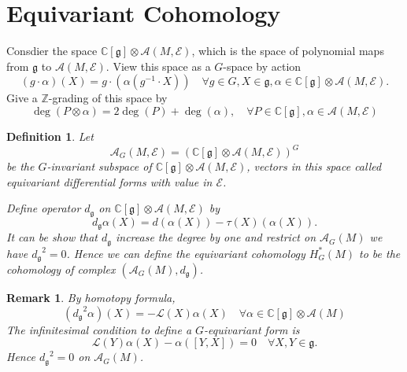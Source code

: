 \documentclass[11pt]{amsart}
\newtheorem{Def}[Thm]{Definition}
\newtheorem{Rmk}[Thm]{Remark}
\def\cA{{\mathcal{A}}}
\def\cAg{{\mathcal{A}_G}}
\def\cL{{\mathcal{L}}}
\def\cE{{\mathcal{E}}}
\def\bC{{\mathbb{C}}}
\def\bZ{{\mathbb{Z}}}
\def\fgg{{\mathfrak{g}}}
\def\bZ{{\mathbb{Z}}}
\def\dg{{d_{\fgg}}}
\begin{document}
\section{Equivariant Cohomology}

Consdier the space $\bC[\fgg]\otimes \cA(M,\cE)$, which is the space of polynomial maps from $\fgg$ to $\cA(M,\cE)$. View this space as a $G$-space by action
\[
(g\cdot \alpha)(X) = g\cdot (\alpha (g^{-1}\cdot X)) \quad \forall g\in G,
X \in \fgg, \alpha \in \bC[\fgg]\otimes \cA(M,\cE).
\]
Give a $\bZ$-grading of this space by 
\[
\deg(P\otimes \alpha) = 2\deg(P)+\deg(\alpha), 
\quad \forall P\in \bC[\fgg], \alpha \in \cA(M,\cE)
\]

\begin{Def}
Let 
\[
\cA_G(M,\cE) = \left(\bC[\fgg]\otimes \cA(M,\cE)\right)^G
\]
be the $G$-invariant subspace of $\bC[\fgg]\otimes \cA(M,\cE)$, vectors in this space called equivariant differential forms with value in $\cE$.

Define operator $\dg$ on $\bC[\fgg]\otimes \cA(M,\cE)$ by
\[
\dg \alpha(X) = d(\alpha(X)) - \tau(X)(\alpha(X)).
\]
It can be show that $\dg$ increase the degree by one and restrict on 
$\cAg(M)$ we have $\dg^2= 0$. Hence we can define
the equivariant cohomology $H_G^*(M)$ to be the cohomology of complex $\left(\cAg(M),\dg\right)$.
\end{Def}

\begin{Rmk}
By homotopy formula,
\[
(\dg^2 \alpha)(X) = - \cL(X)\alpha(X)\quad \forall \alpha
\in \bC[\fgg]\otimes \cA(M)
\]
The infinitesimal condition to define a $G$-equivariant form is 
\[
\cL(Y)\alpha(X) - \alpha([Y,X]) = 0 \quad \forall X,Y \in \fgg.
\]
Hence $\dg^2 = 0$ on $\cAg(M)$.
\end{Rmk}
\end{document}
